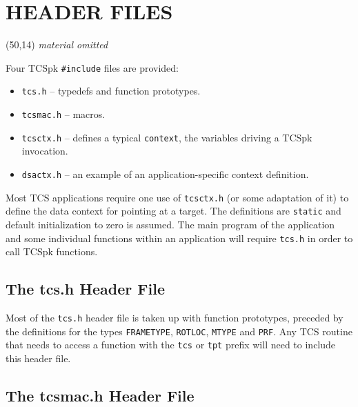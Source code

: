 \documentclass[12pt,fleqn,twoside]{article}
\renewcommand{\_}{{\tt\char'137}}     %
\newcommand{\abridged}  {\vspace{3ex} \begin{center}
                        \framebox(50,14){\vspace*{1mm}
                        \large \it material omitted}
                        \end{center}\vspace{3ex}}
\begin{document}
\newpage
\fi

\section{HEADER FILES}

\ifx\vdoc\vshort
\abridged
\else
Four TCSpk {\tt \#include} files are provided:
\begin{itemize}

\item {\tt tcs.h} -- typedefs and function prototypes.

\item {\tt tcsmac.h} -- macros.

\item {\tt tcsctx.h} -- defines a typical {\tt context}, the
variables driving a TCSpk invocation.

\item {\tt dsactx.h} -- an example of an application-specific
context definition.

\end{itemize}
Most TCS applications require one use of {\tt tcsctx.h} (or some
adaptation of it) to define the data context for pointing at a
target. The definitions are {\tt static} and default
initialization to zero is assumed.  The main
program of the application and some individual functions
within an application will require {\tt tcs.h} in order to call
TCSpk functions.

\subsection{The tcs.h Header File}
\label{tcsdoth}

Most of the {\tt tcs.h} header file is taken up with function prototypes,
preceded by the definitions for the
types {\tt FRAMETYPE}, {\tt ROTLOC}, {\tt MTYPE} and {\tt PRF}.
Any TCS routine that needs to access a function with the {\tt tcs} or
{\tt tpt} prefix will need to include this header file.

\subsection{The tcsmac.h Header File}
\label{tcsmacdoth}
\end{document}
